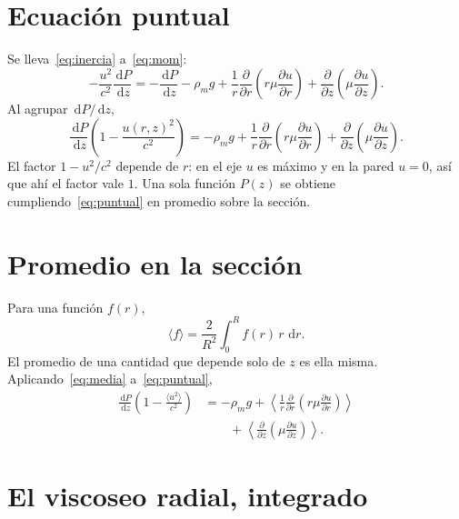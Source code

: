 \documentclass[11pt,a4paper]{article}
\newcommand{\dd}{\,\mathrm{d}}
\newcommand{\p}{\partial}
\theoremstyle{plain}
\theoremstyle{definition}
\theoremstyle{remark}
\begin{document}
\section{Ecuación puntual}

Se lleva~\eqref{eq:inercia} a~\eqref{eq:mom}:
\begin{equation}
-\frac{u^2}{c^2}\frac{\dd P}{\dd z}
=
-\frac{\dd P}{\dd z}
-\rho_m g
+\frac{1}{r}\frac{\p}{\p r}\!\left(r\mu\frac{\p u}{\p r}\right)
+\frac{\p}{\p z}\!\left(\mu\frac{\p u}{\p z}\right).
\end{equation}
Al agrupar \(\dd P/\dd z\),
\begin{equation}
\frac{\dd P}{\dd z}
\left(1-\frac{u(r,z)^2}{c^2}\right)
=
-\rho_m g
+\frac{1}{r}\frac{\p}{\p r}\!\left(r\mu\frac{\p u}{\p r}\right)
+\frac{\p}{\p z}\!\left(\mu\frac{\p u}{\p z}\right).
\label{eq:puntual}
\end{equation}
El factor \(1-u^2/c^2\) depende de \(r\): en el eje \(u\) es máximo y en la
pared \(u=0\), así que ahí el factor vale \(1\). Una sola función \(P(z)\)
se obtiene cumpliendo~\eqref{eq:puntual} en promedio sobre la sección.

\section{Promedio en la sección}

Para una función \(f(r)\),
\begin{equation}
\langle f\rangle
=
\frac{2}{R^2}\int_0^R f(r)\,r\,\dd r.
\label{eq:media}
\end{equation}
El promedio de una cantidad que depende solo de \(z\) es ella misma.
Aplicando~\eqref{eq:media} a~\eqref{eq:puntual},
\begin{equation}
\begin{aligned}
\frac{\dd P}{\dd z}
\left(1-\frac{\langle u^2\rangle}{c^2}\right)
&=
-\rho_m g
+\left\langle
\frac{1}{r}\frac{\p}{\p r}\!\left(r\mu\frac{\p u}{\p r}\right)
\right\rangle
\\
&\qquad
+\left\langle
\frac{\p}{\p z}\!\left(\mu\frac{\p u}{\p z}\right)
\right\rangle.
\end{aligned}
\label{eq:prom}
\end{equation}

\section{El viscoseo radial, integrado}
\end{document}
